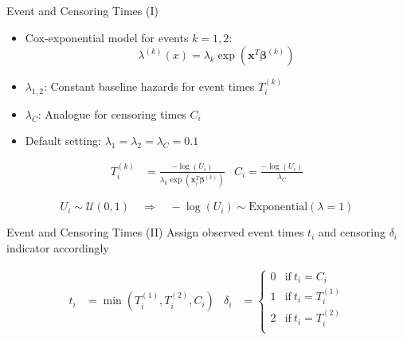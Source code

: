 \documentclass{beamer}
\providecommand{\tightlist}{%
  \setlength{\itemsep}{0pt}\setlength{\parskip}{0pt}}
\begin{document}
\begin{frame}{Event and Censoring Times (I)}
\protect\hypertarget{event-and-censoring-times-i}{}
\begin{itemize}
\tightlist
\item
  Cox-exponential model for events \(k = 1,2\):
  \[\lambda^{(k)}(x) = \lambda_k \exp(\mathbf{x}^T \pmb{\beta}^{(k)})\]
\item
  \(\lambda_{1,2}\): Constant baseline hazards for event times
  \(T_i^{(k)}\)
\item
  \(\lambda_C\): Analogue for censoring times \(C_i\)
\item
  Default setting: \(\lambda_1 = \lambda_2 = \lambda_C = 0.1\)
\end{itemize}

\begin{align*}
T_i^{(k)} &= \frac{-\log(U_i)}{\lambda_k \exp(\mathbf{x}^{T}_i\pmb{\beta}^{(k)})} &
C_i       = \frac{-\log(U_i)}{\lambda_C}
\end{align*}

\[U_i \sim \mathcal{U}(0, 1) \quad \Longrightarrow \quad  -\log(U_i) \sim \mathrm{Exponential}(\lambda = 1)\]
\end{frame}

\begin{frame}{Event and Censoring Times (II)}
\protect\hypertarget{event-and-censoring-times-ii}{}
Assign observed event times \(t_i\) and censoring \(\delta_i\) indicator
accordingly

\begin{align*}
t_i &= \min(T_i^{(1)}, T_i^{(2)}, C_i) & 
\delta_i &= \begin{cases}
  0 & \text{if}\ t_i = C_i \\
  1 & \text{if}\ t_i = T_i^{(1)} \\
  2 & \text{if}\ t_i = T_i^{(2)} \\
  \end{cases}
\end{align*}
\end{frame}
\end{document}
